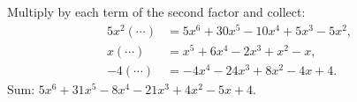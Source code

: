 Multiply by each term of the second factor and collect:
\[\begin{aligned}5x^2(\cdots)&=5x^6+30x^5-10x^4+5x^3-5x^2,\\ x(\cdots)&=x^5+6x^4-2x^3+x^2-x,\\ -4(\cdots)&=-4x^4-24x^3+8x^2-4x+4.\end{aligned}\]
Sum: $\boxed{5x^6+31x^5-8x^4-21x^3+4x^2-5x+4}$.
